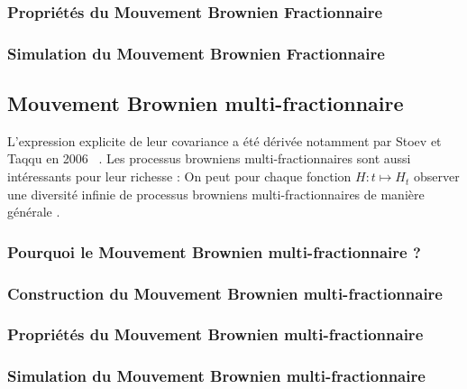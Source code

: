 \subsubsection{Propriétés du Mouvement Brownien Fractionnaire}

\subsubsection{Simulation du Mouvement Brownien Fractionnaire}

\subsection{Mouvement Brownien multi-fractionnaire}

L'expression explicite de leur covariance a été dérivée notamment par Stoev et Taqqu en 2006 ~\cite{mfbm-howrich}. Les processus browniens multi-fractionnaires sont aussi intéressants pour leur \og richesse \fg : On peut pour chaque fonction $H : t \mapsto H_t$ observer \og une diversité infinie de processus browniens multi-fractionnaires de manière générale \fg.~\cite{mfbm-howrich}

\subsubsection{Pourquoi le Mouvement Brownien multi-fractionnaire ?}

\subsubsection{Construction du Mouvement Brownien multi-fractionnaire}

\subsubsection{Propriétés du Mouvement Brownien multi-fractionnaire}

\subsubsection{Simulation du Mouvement Brownien multi-fractionnaire}